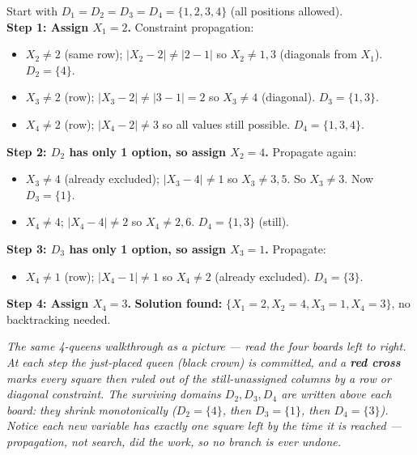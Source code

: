 \documentclass[11pt, a4paper]{article}
\begin{document}
\begin{exbox}
Start with $D_1 = D_2 = D_3 = D_4 = \{1, 2, 3, 4\}$ (all positions allowed).\\[0.3em]
\textbf{Step 1: Assign $X_1 = 2$.} Constraint propagation:
\begin{itemize}[leftmargin=*, itemsep=0pt, topsep=0pt]
  \item $X_2 \neq 2$ (same row); $|X_2 - 2| \neq |2 - 1|$ so $X_2 \neq 1, 3$ (diagonals from $X_1$). $D_2 = \{4\}$.
  \item $X_3 \neq 2$ (row); $|X_3 - 2| \neq |3 - 1| = 2$ so $X_3 \neq 4$ (diagonal). $D_3 = \{1, 3\}$.
  \item $X_4 \neq 2$ (row); $|X_4 - 2| \neq 3$ so all values still possible. $D_4 = \{1, 3, 4\}$.
\end{itemize}
\textbf{Step 2: $D_2$ has only 1 option, so assign $X_2 = 4$.} Propagate again:
\begin{itemize}[leftmargin=*, itemsep=0pt, topsep=0pt]
  \item $X_3 \neq 4$ (already excluded); $|X_3 - 4| \neq 1$ so $X_3 \neq 3, 5$. So $X_3 \neq 3$. Now $D_3 = \{1\}$.
  \item $X_4 \neq 4$; $|X_4 - 4| \neq 2$ so $X_4 \neq 2, 6$. $D_4 = \{1, 3\}$ (still).
\end{itemize}
\textbf{Step 3: $D_3$ has only 1 option, so assign $X_3 = 1$.} Propagate:
\begin{itemize}[leftmargin=*, itemsep=0pt, topsep=0pt]
  \item $X_4 \neq 1$ (row); $|X_4 - 1| \neq 1$ so $X_4 \neq 2$ (already excluded). $D_4 = \{3\}$.
\end{itemize}
\textbf{Step 4: Assign $X_4 = 3$.} \textbf{Solution found:} $\{X_1 = 2, X_2 = 4, X_3 = 1, X_4 = 3\}$, no backtracking needed.
\end{exbox}

\begin{center}

\footnotesize\textit{The same 4-queens walkthrough as a picture --- read the four boards left to right. At each step the just-placed queen (black crown) is committed, and a \textbf{red cross} marks every square then ruled out of the still-unassigned columns by a row or diagonal constraint. The surviving domains $D_2,D_3,D_4$ are written above each board: they shrink monotonically ($D_2{=}\{4\}$, then $D_3{=}\{1\}$, then $D_4{=}\{3\}$). Notice each new variable has exactly one square left by the time it is reached --- propagation, not search, did the work, so no branch is ever undone.}
\end{center}
\end{document}

